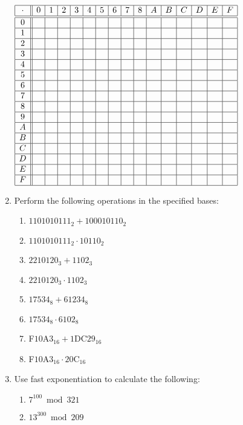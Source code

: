 \documentclass[letterpaper,12pt,fleqn]{article}
\begin{document}
\begin{enumerate}[left=0in,itemsep=0.5in]
  \(\begin{array}{|c||c|c|c|c|c|c|c|c|c|c|c|c|c|c|c|c|}
  \hline
  \cdot & 0 & 1 & 2 & 3 & 4 & 5 & 6 & 7 & 8 & A & B & C & D & E & F \\
  \hline
  \hline
  0 & & & & & & & & & & & & & & & \\
  \hline
  1 & & & & & & & & & & & & & & & \\
  \hline
  2 & & & & & & & & & & & & & & & \\
  \hline
  3 & & & & & & & & & & & & & & & \\
  \hline
  4 & & & & & & & & & & & & & & & \\
  \hline
  5 & & & & & & & & & & & & & & & \\
  \hline
  6 & & & & & & & & & & & & & & & \\
  \hline
  7 & & & & & & & & & & & & & & & \\
  \hline
  8 & & & & & & & & & & & & & & & \\
  \hline
  9 & & & & & & & & & & & & & & & \\
  \hline
  A & & & & & & & & & & & & & & & \\
  \hline
  B & & & & & & & & & & & & & & & \\
  \hline
  C & & & & & & & & & & & & & & & \\
  \hline
  D & & & & & & & & & & & & & & & \\
  \hline
  E & & & & & & & & & & & & & & & \\
  \hline
  F & & & & & & & & & & & & & & & \\
  \hline
  \end{array}\)

\item Perform the following operations in the specified bases:
  \begin{enumerate}
  \item \(1101010111_2+100010110_2\)
  \item \(1101010111_2\cdot10110_2\)
  \item \(2210120_3+1102_3\)
  \item \(2210120_3\cdot1102_3\)
  \item \(17534_8+61234_8\)
  \item \(17534_8\cdot6102_8\)
  \item F\(10\)A\(3_{16}+1\)DC\(29_{16}\)
  \item F\(10\)A\(3_{16}\cdot20\)C\(_{16}\)
  \end{enumerate}

\item Use fast exponentiation to calculate the following:
  \begin{enumerate}
  \item \(7^{100}\bmod321\)
  \item \(13^{300}\bmod209\)
  \end{enumerate}

\end{enumerate}
\end{document}
